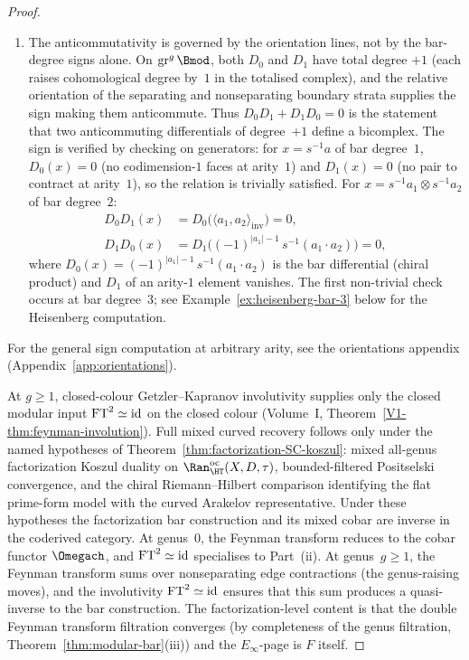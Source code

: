 \begin{proof}
\begin{remark}
\begin{enumerate}[label=\textup{(\roman*)}]
\item The anticommutativity is governed by the orientation
 lines, not by the bar-degree signs alone. On
 $\mathrm{gr}^g\,\Bmod$, both $D_0$ and $D_1$ have total
 degree $+1$ (each raises cohomological degree by~$1$ in the
 totalised complex), and the relative orientation of the
 separating and nonseparating boundary strata supplies the
 sign making them anticommute. Thus $D_0 D_1 + D_1 D_0 = 0$
 is the statement that two anticommuting differentials of
 degree~$+1$ define a bicomplex. The sign is verified by
 checking on generators: for $x = s^{-1}a$ of bar degree~$1$,
 $D_0(x) = 0$ (no codimension-$1$ faces at arity~$1$) and
 $D_1(x) = 0$ (no pair to contract at arity~$1$), so the
 relation is trivially satisfied. For $x = s^{-1}a_1 \otimes
 s^{-1}a_2$ of bar degree~$2$:
 \begin{align*}
 D_0 D_1(x) &= D_0\bigl(\langle a_1, a_2\rangle_{\mathrm{inv}}\bigr)
 = 0, \\
 D_1 D_0(x) &= D_1\bigl((-1)^{|a_1|-1}\, s^{-1}(a_1 \cdot a_2)\bigr)
 = 0,
 \end{align*}
 where $D_0(x) = (-1)^{|a_1|-1}\,s^{-1}(a_1 \cdot a_2)$ is the
 bar differential (chiral product) and $D_1$ of an arity-$1$ element
 vanishes. The first non-trivial check occurs at bar degree~$3$;
 see Example~\ref{ex:heisenberg-bar-3} below for the Heisenberg
 computation.
\end{enumerate}
For the general sign computation at arbitrary arity, see the
orientations appendix (Appendix~\ref{app:orientations}).
\end{remark}

At $g\geq 1$, closed-colour Getzler--Kapranov involutivity supplies
only the closed modular input
$\mathrm{FT}^2\simeq\mathrm{id}$ on the closed colour
(Volume~I, Theorem~\ref*{V1-thm:feynman-involution}). Full mixed
curved recovery follows only under the named hypotheses of
Theorem~\ref{thm:factorization-SC-koszul}: mixed all-genus
factorization Koszul duality on
$\Ran^{\mathrm{oc}}_{\HT}(X,D,\tau)$, bounded-filtered
Positselski convergence, and the chiral Riemann--Hilbert comparison
identifying the flat prime-form model with the curved Arakelov
representative. Under these hypotheses the factorization bar
construction and its mixed cobar are inverse in the coderived
category. At genus~$0$, the
Feynman transform reduces to the cobar functor $\Omegach$,
and $\mathrm{FT}^2 \simeq \mathrm{id}$ specialises to
Part~(ii). At genus~$g \geq 1$, the Feynman transform
sums over nonseparating edge contractions
(the genus-raising moves), and the involutivity
$\mathrm{FT}^2 \simeq \mathrm{id}$ ensures that this sum produces
a quasi-inverse to the bar construction.
The factorization-level content is that the double Feynman
transform filtration converges (by completeness of the genus
filtration, Theorem~\ref{thm:modular-bar}(iii)) and the
$E_\infty$-page is $F$ itself.


\end{proof}
